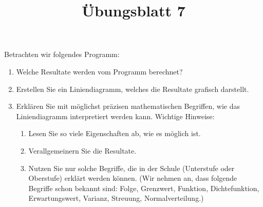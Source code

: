 \documentclass{article}
\begin{document}
\title{Übungsblatt 7}
\date{}
\maketitle
{}
\makeatletter
\def\lst@outputspace{{\ifx\lst@bkgcolor\empty\color{white}\else\lst@bkgcolor\fi\lst@visiblespace}}
\makeatother
\thispagestyle{empty}

\noindent Betrachten wir folgendes Programm:


\begin{enumerate}
\item Welche Resultate werden vom Programm berechnet?
\item Erstellen Sie ein Liniendiagramm, welches die Resultate grafisch darstellt.
\item Erklären Sie mit möglichst präzisen mathematischen Begriffen, wie das Liniendiagramm interpretiert werden kann.
Wichtige Hinweise:
\begin{enumerate}
\item Lesen Sie so viele Eigenschaften ab, wie es möglich ist.
\item Verallgemeinern Sie die Resultate.
\item Nutzen Sie nur solche Begriffe, die in der Schule (Unterstufe oder Oberstufe) erklärt werden können.
(Wir nehmen an, dass folgende Begriffe schon bekannt sind: Folge, Grenz\-wert, Funktion,
Dichtefunktion, Erwartungswert, Varianz, Streuung, Normalverteilung.)
\end{enumerate}

\end{enumerate}
\end{document}
